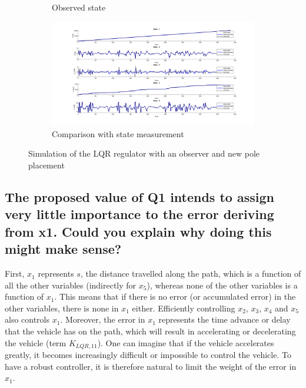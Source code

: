 \begin{figure}[H]
\begin{subfigure}[b]{0.8\textwidth}
         \caption{Observed state}
         \label{fig:State}
     \end{subfigure}
     \begin{subfigure}[b]{0.8\textwidth}
         \centering
         \includegraphics[width=\textwidth]{Latex report/image/ex2/obs.png}
         \caption{Comparison with state measurement}
         \label{fig:Obs}
     \end{subfigure}
    \caption{Simulation of the LQR regulator with an observer and new pole placement}
    \label{fig:sim}
\end{figure}

\subsection{The proposed value of Q1 intends to assign very little importance to the error deriving from x1. Could you explain why doing this might make sense?}

First, $x_1$ represents $s$, the distance travelled along the path, which is a function of all the other variables (indirectly for $x_5$), whereas none of the other variables is a function of $x_1$. This means that if there is no error (or accumulated error) in the other variables, there is none in $x_1$ either. Efficiently controlling $x_2$, $x_3$, $x_4$ and $x_5$ also controls $x_1$. Moreover, the error in $x_1$ represents the time advance or delay that the vehicle has on the path, which will result in accelerating or decelerating the vehicle (term $K_{LQR,11}$). One can imagine that if the vehicle accelerates greatly, it becomes increasingly difficult or impossible to control the vehicle. To have a robust controller, it is therefore natural to limit the weight of the error in $x_1$.



